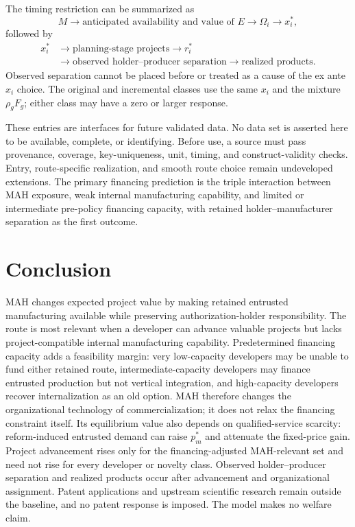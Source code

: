 \documentclass[12pt]{article}
\newcommand{\1}{\mathbf{1}}
\begin{document}
The timing restriction can be summarized as
\begin{equation}
  M
  \longrightarrow
  \text{anticipated availability and value of }E
  \longrightarrow
  \Omega_i
  \longrightarrow
  x_i^*,
  \label{eq:empirical-anticipated-chain}
\end{equation}
followed by
\begin{equation}
  \begin{aligned}
  x_i^*
  &\longrightarrow
  \text{planning-stage projects}
  \longrightarrow r_i^* \\
  &\longrightarrow
  \text{observed holder--producer separation}
  \longrightarrow
  \text{realized products}.
  \end{aligned}
  \label{eq:empirical-realized-chain}
\end{equation}
Observed separation cannot be placed before or treated as a cause of the ex
ante \(x_i\) choice. The original and incremental classes use the same
\(x_i\) and the mixture \(\rho_gF_g\); either class may have a zero or larger
response.

These entries are interfaces for future validated data. No data set is
asserted here to be available, complete, or identifying. Before use, a source
must pass provenance, coverage, key-uniqueness, unit, timing, and
construct-validity checks. Entry, route-specific realization, and smooth
route choice remain undeveloped extensions. The primary financing prediction
is the triple interaction between MAH exposure, weak internal manufacturing
capability, and limited or intermediate pre-policy financing capacity, with
retained holder--manufacturer separation as the first outcome.

\section{Conclusion}

MAH changes expected project value by making retained entrusted manufacturing
available while preserving authorization-holder responsibility. The route is
most relevant when a developer can advance valuable projects but lacks
project-compatible internal manufacturing capability. Predetermined financing
capacity adds a feasibility margin: very low-capacity developers may be unable
to fund either retained route, intermediate-capacity developers may finance
entrusted production but not vertical integration, and high-capacity
developers recover internalization as an old option. MAH therefore changes
the organizational technology of commercialization; it does not relax the
financing constraint itself. Its equilibrium value also depends on
qualified-service scarcity: reform-induced entrusted demand can raise
\(p_m^*\) and attenuate the fixed-price gain. Project advancement rises only
for the financing-adjusted MAH-relevant set and need not rise for every
developer or novelty class. Observed holder--producer separation and realized
products occur after advancement and organizational assignment. Patent
applications and upstream scientific research remain outside the baseline,
and no patent response is imposed. The model makes no welfare claim.

\clearpage


\end{document}
